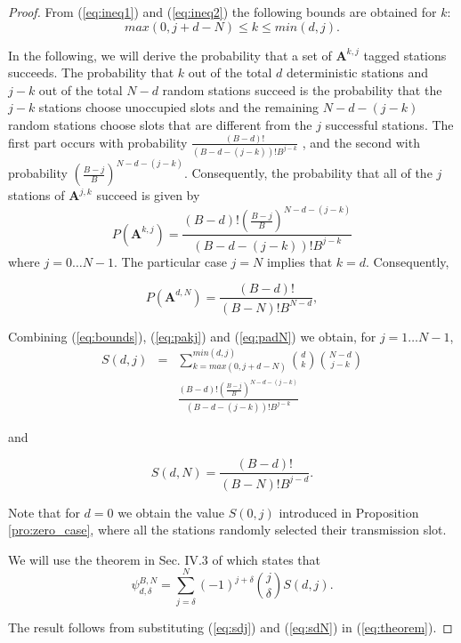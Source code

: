\documentclass[journal]{IEEEtran}
\begin{document}
\begin{proof}
From (\ref{eq:ineq1}) and (\ref{eq:ineq2}) the following bounds are obtained for $k$:
\begin{equation}
\label{eq:bounds}
max(0,j+d-N) \leq k \leq min(d,j).
\end{equation}

In the following, we will derive the probability that a set of $\mathbf{A}^{k,j}$ tagged stations succeeds.
The probability that $k$ out of the total $d$ deterministic stations and $j-k$ out of the total $N-d$ random stations succeed is the probability that the $j-k$ stations choose unoccupied slots and the remaining $N-d-(j-k)$random stations choose slots that are different from the $j$ successful stations.
The first part occurs with probability $\frac{(B-d)!}{\left(B-d-(j-k) \right)!B^{j-k}}$  , and the second with probability $\left(\frac{B-j}{B} \right)^{N-d-(j-k)}$.
Consequently, the probability that all of the $j$ stations of $\mathbf{A}^{j,k}$ succeed is given by
\begin{equation}
\label{eq:pakj}
P(\mathbf{A}^{k,j}) 
= \frac{(B-d)!\left( \frac{B-j}{B} \right)^{N-d-(j-k)}}{(B-d-(j-k))!B^{j-k}}
\end{equation}
where $j=0\dots N-1$.
The particular case $j=N$ implies that $k=d$.
Consequently,

\begin{equation}
\label{eq:padN}
P(\mathbf{A}^{d,N})=\frac{(B-d)!}{(B-N)!B^{N-d}},
\end{equation}

Combining (\ref{eq:bounds}), (\ref{eq:pakj}) and (\ref{eq:padN}) we obtain, for $j=1 \dots N-1$,
\begin{eqnarray}
\label{eq:sdj}
S(d,j) & {}={} & \sum_{k=max(0,j+d-N)}^{min(d,j)} \binom{d}{k} \binom{N-d}{j-k} \nonumber\\
&& \frac{(B-d)!\left(\frac{B-j}{B} \right)^{N-d-(j-k)}}{\left(B-d-(j-k)\right)!B^{j-k}} 
\end{eqnarray}

and

\begin{equation}
\label{eq:sdN}
S(d,N)= \frac{(B-d)!}{(B-N)!B^{j-d}}.
\end{equation}

Note that for $d=0$ we obtain the value $S(0,j)$ introduced in Proposition \ref{pro:zero_case}, where all the stations randomly selected their transmission slot.

We will use the theorem in Sec. IV.3 of \cite{feller1968ipt} which states that
\begin{equation}
\label{eq:theorem}
\psi^{B,N}_{d,\delta} = \sum_{j=\delta}^{N} (-1)^{j+\delta}\binom{j}{\delta} S(d,j).
\end{equation}

The result follows from substituting (\ref{eq:sdj}) and (\ref{eq:sdN}) in (\ref{eq:theorem}).

\end{proof}
\end{document}
